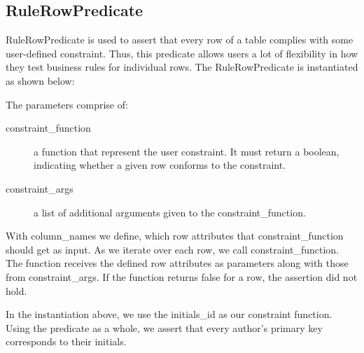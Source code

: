 \subsection{RuleRowPredicate}\label{RCP}
RuleRowPredicate is used to assert that every row of a table complies with some user-defined constraint. Thus, this predicate allows users a lot of flexibility in how they test business rules for individual rows. The RuleRowPredicate is instantiated as shown below:


The parameters comprise of:
\begin{description}
\item [constraint\_function] a function that represent the user constraint. It must return a boolean, indicating whether a given row conforms to the constraint.
\item [constraint\_args] a list of additional arguments given to the constraint\_function.
\end{description}

With column\_names we define, which row attributes that constraint\_function should get as input. As we iterate over each row, we call constraint\_function. The function receives the defined row attributes as parameters along with those from constraint\_args. If the function returns false for a row, the assertion did not hold.

In the instantiation above, we use the initials\_id as our constraint function. Using the predicate as a whole, we assert that every author's primary key corresponds to their initials. 
